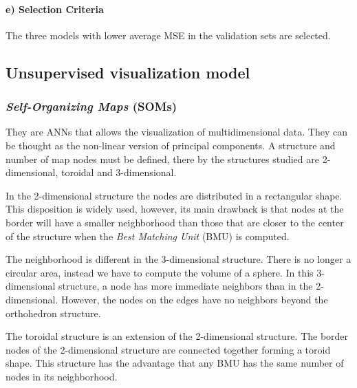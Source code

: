 \documentclass[conference]{IEEEtran}
\begin{document}
\paragraph*{e) Selection Criteria} 

The three models with lower average MSE in the validation sets are selected. 

\subsection{Unsupervised visualization model}

\subsubsection{\textit{Self-Organizing Maps} (SOMs)} They are ANNs that allows the visualization of multidimensional data. They can be thought as the non-linear version of principal components. A structure and number of map nodes must be defined, there by the structures studied are 2-dimensional, toroidal and 3-dimensional.


\begin{comment}
In the 2-dimensional structure the nodes are arranged rectangularly. Even though this disposition is widely used, its main drawback is that nodes at the border will have less choices of updating their weights than those that are closer to the center of the structure when the \textit{Best Matching Unit} (BMU) is computed.
\end{comment}

In the 2-dimensional structure the nodes are distributed in a rectangular shape. This disposition is widely used, however, its main drawback is that nodes at the border will have a smaller neighborhood than those that are closer to the center of the structure when the \textit{Best Matching Unit} (BMU) is computed.

The neighborhood is different in the 3-dimensional structure. There is no longer a circular area, instead we have to compute the volume of a sphere. In this 3-dimensional structure, a node has more immediate neighbors than in the 2-dimensional. However, the nodes on the edges have no neighbors beyond the orthohedron structure.

The toroidal structure is an extension of the 2-dimensional structure. The border nodes of the 2-dimensional structure are connected together forming a toroid shape. This structure has the advantage that any BMU has the same number of nodes in its neighborhood.
\end{document}
